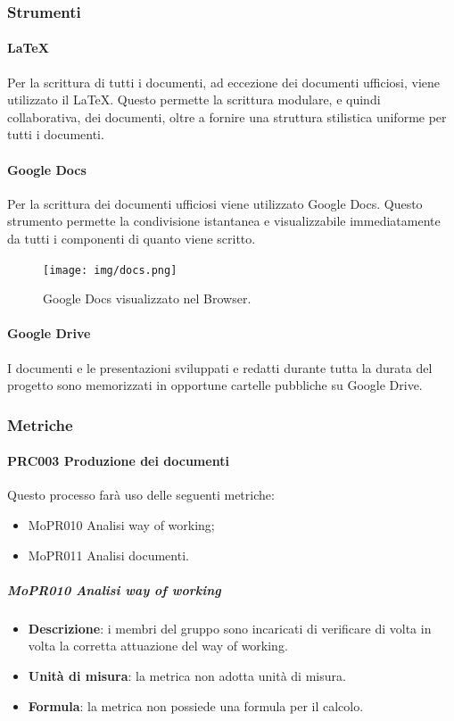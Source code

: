 \documentclass[../norme-di-progetto.tex]{subfiles}
\begin{document}
\subsubsection{Strumenti}
\paragraph{\LaTeX}
Per la scrittura di tutti i documenti, ad eccezione dei documenti ufficiosi, viene utilizzato il  \LaTeX. Questo permette la scrittura modulare, e quindi collaborativa, dei documenti, oltre a fornire una struttura stilistica uniforme per tutti i documenti.

\paragraph{Google Docs}
Per la scrittura dei documenti ufficiosi viene utilizzato Google Docs. Questo strumento permette la condivisione istantanea e visualizzabile immediatamente da tutti i componenti di quanto viene scritto.

\begin{figure}[H]
  \centering
  \texttt{[image: img/docs.png]}
  \label{fig:github}
  \caption{Google Docs visualizzato nel Browser.}
\end{figure}

\paragraph{Google Drive}
I documenti e le presentazioni sviluppati e redatti durante tutta la durata del progetto sono memorizzati in opportune cartelle pubbliche su Google Drive.

\subsubsection{Metriche}
\paragraph{PRC003 Produzione dei documenti}
Questo processo farà uso delle seguenti metriche:
\begin{itemize}
  \item MoPR010 Analisi way of working;
  \item MoPR011 Analisi documenti.
\end{itemize}
\subparagraph{MoPR010 Analisi way of working}
\begin{itemize}
  \item \textbf{Descrizione}: i membri del gruppo sono incaricati di verificare di volta in volta la corretta attuazione del way of working.
  \item \textbf{Unità di misura}: la metrica non adotta unità di misura.
  \item \textbf{Formula}: la metrica non possiede una formula per il calcolo.
\end{itemize}
\end{document}
